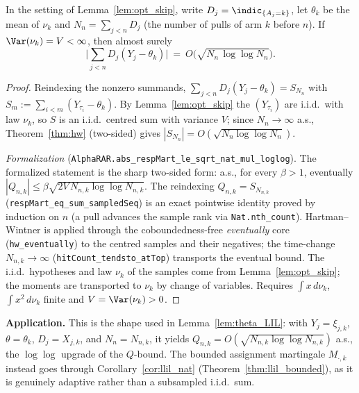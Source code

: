 \begin{corollary}\label{cor:subsampled_lil}
\leanok
{}
In the setting of Lemma~\ref{lem:opt_skip}, write $D_j=\indic_{\{A_j=k\}}$, let $\theta_k$ be the
mean of $\nu_k$ and $N_n=\sum_{j<n}D_j$ (the number of pulls of arm $k$ before $n$). If
$\Var(\nu_k)=V<\infty$, then almost surely
\[
  \Big|\sum_{j<n}D_j(Y_j-\theta_k)\Big|\ =\ O\!\big(\sqrt{N_n\,\log\log N_n}\big).
\]
\end{corollary}
\begin{proof}\leanok
Reindexing the nonzero summands, $\sum_{j<n}D_j(Y_j-\theta_k)=S_{N_n}$ with
$S_m:=\sum_{i<m}(Y_{\tau_i}-\theta_k)$. By Lemma~\ref{lem:opt_skip} the $(Y_{\tau_i})$ are i.i.d.\ with
law $\nu_k$, so $S$ is an i.i.d.\ centred sum with variance $V$; since $N_n\to\infty$ a.s.,
Theorem~\ref{thm:hw} (two-sided) gives $|S_{N_n}|=O(\sqrt{N_n\log\log N_n})$.

\emph{Formalization} (\texttt{AlphaRAR.abs\_respMart\_le\_sqrt\_nat\_mul\_loglog}). The formalized
statement is the sharp two-sided form: a.s., for every $\beta>1$, eventually
$|Q_{n,k}|\le\beta\sqrt{2V\,N_{n,k}\log\log N_{n,k}}$. The reindexing $Q_{n,k}=S_{N_{n,k}}$
(\texttt{respMart\_eq\_sum\_sampledSeq}) is an exact pointwise identity proved by induction on $n$
(a pull advances the sample rank via \texttt{Nat.nth\_count}). Hartman--Wintner is applied through
the coboundedness-free \emph{eventually} core (\texttt{hw\_eventually}) to the centred samples and
their negatives; the time-change $N_{n,k}\to\infty$ (\texttt{hitCount\_tendsto\_atTop}) transports
the eventual bound. The i.i.d.\ hypotheses and law $\nu_k$ of the samples come from
Lemma~\ref{lem:opt_skip}; the moments are transported to $\nu_k$ by change of variables. Requires
$\int x\,d\nu_k$, $\int x^2\,d\nu_k$ finite and $V=\Var(\nu_k)>0$.
\end{proof}

\textbf{Application.} This is the shape used in Lemma~\ref{lem:theta_LIL}: with
$Y_j=\xi_{j,k}$, $\theta=\theta_k$, $D_j=X_{j,k}$, and $N_n=N_{n,k}$, it yields
$Q_{n,k}=O(\sqrt{N_{n,k}\log\log N_{n,k}})$ a.s., the $\log\log$ upgrade of the
$Q$-bound. The bounded assignment martingale $M_{\cdot,k}$ instead goes through
Corollary~\ref{cor:llil_nat} (Theorem~\ref{thm:llil_bounded}), as it is genuinely
adaptive rather than a subsampled i.i.d.\ sum.

